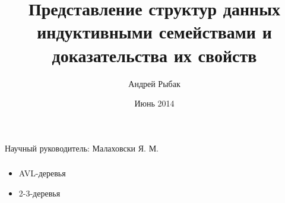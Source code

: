 \documentclass[17pt]{beamer}
\title{Представление структур данных индуктивными семействами и доказательства их свойств}
\institute{НИУ ИТМО}
\author{Андрей Рыбак}
\date{
Июнь 2014
}
\begin{document}
{
\fontsize{14pt}{14pt}\selectfont
{}
\begin{frame}
  \maketitle
  \begin{flushright}
    Научный руководитель: Малаховски Я. М.
  \end{flushright}
\end{frame}
}


\begin{frame}
    \frametitle{}
    \begin{itemize}
        \item AVL-деревья
        \item 2-3-деревья
    \end{itemize}
\end{frame}

\AgdaHide{

}
\end{document}
